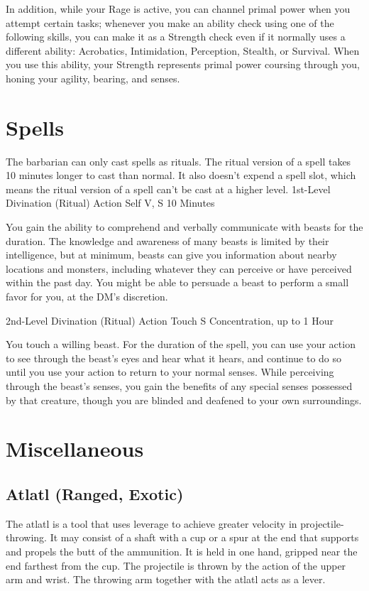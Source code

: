 \documentclass[letterpaper,openany,oneside,twocolumn]{book}
\begin{document}
In addition, while your Rage is active, you can channel primal power when you attempt certain tasks; whenever you make an ability check using one of the following skills, you can make it as a Strength check even if it normally uses a different ability: Acrobatics, Intimidation, Perception, Stealth, or Survival. When you use this ability, your Strength represents primal power coursing through you, honing your agility, bearing, and senses.

\section*{Spells}
The barbarian can only cast spells as rituals. The ritual version of a spell takes 10 minutes longer to cast than normal. It also doesn't expend a spell slot, which means the ritual version of a spell can't be cast at a higher level.
	{1st-Level Divination (Ritual)}
	{Action}
	{Self}
	{V, S}
	{10 Minutes}

You gain the ability to comprehend and verbally communicate with beasts for the duration. The knowledge and awareness of many beasts is limited by their intelligence, but at minimum, beasts can give you information about nearby locations and monsters, including whatever they can perceive or have perceived within the past day. You might be able to persuade a beast to perform a small favor for you, at the DM's discretion.

	{2nd-Level Divination (Ritual)}
	{Action}
	{Touch}
	{S}
	{Concentration, up to 1 Hour}

You touch a willing beast. For the duration of the spell, you can use your action to see through the beast's eyes and hear what it hears, and continue to do so until you use your action to return to your normal senses. While perceiving through the beast's senses, you gain the benefits of any special senses possessed by that creature, though you are blinded and deafened to your own surroundings.

\section*{Miscellaneous}
\subsection*{Atlatl (Ranged, Exotic)}
The atlatl is a tool that uses leverage to achieve greater velocity in projectile-throwing. It may consist of a shaft with a cup or a spur at the end that supports and propels the butt of the ammunition. It is held in one hand, gripped near the end farthest from the cup. The projectile is thrown by the action of the upper arm and wrist. The throwing arm together with the atlatl acts as a lever.
\end{document}
